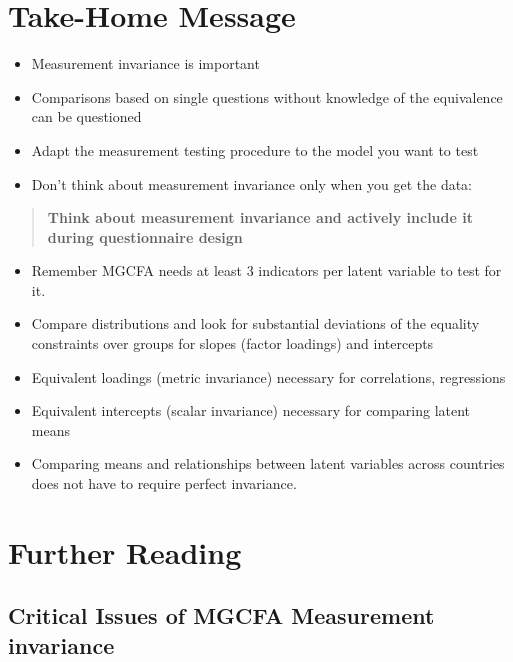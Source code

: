\documentclass[
]{book}
\begin{document}
\hypertarget{home}{%
\chapter{Take-Home Message}\label{home}}

\begin{itemize}
\item
  Measurement invariance is important
\item
  Comparisons based on single questions without knowledge of the equivalence can be questioned
\item
  Adapt the measurement testing procedure to the model you want to test
\item
  Don't think about measurement invariance only when you get the data:
\end{itemize}

\begin{quote}
\textbf{Think about measurement invariance and actively include it during questionnaire design}
\end{quote}

\begin{itemize}
\item
  Remember MGCFA needs at least 3 indicators per latent variable to test for it.
\item
  Compare distributions and look for substantial deviations of the equality constraints over groups for slopes (factor loadings) and intercepts
\item
  Equivalent loadings (metric invariance) necessary for correlations, regressions
\item
  Equivalent intercepts (scalar invariance) necessary for comparing latent means
\item
  Comparing means and relationships between latent variables across countries does not have to require perfect invariance.
\end{itemize}

\hypertarget{further}{%
\chapter{Further Reading}\label{further}}

\hypertarget{critical-issues-of-mgcfa-measurement-invariance}{%
\section{Critical Issues of MGCFA Measurement invariance}\label{critical-issues-of-mgcfa-measurement-invariance}}
\end{document}
